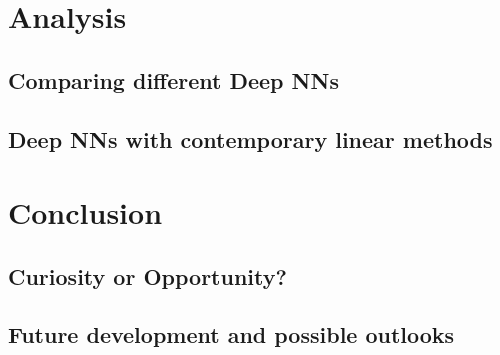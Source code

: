 

\newpage


\section{Analysis}

\subsection{Comparing different Deep NNs}

\subsection{Deep NNs with contemporary linear methods}


\newpage

\section{Conclusion}

\subsection{Curiosity or Opportunity?}

\subsection{Future development and possible outlooks}

